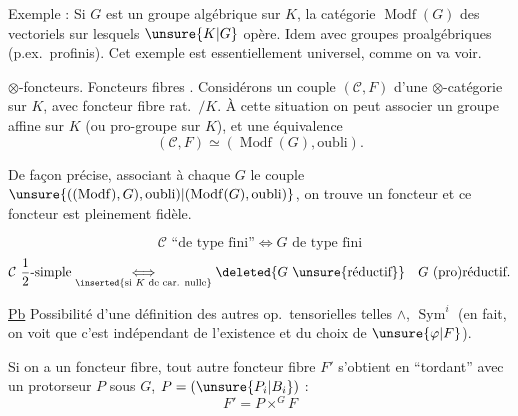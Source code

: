 Exemple : Si $G$ est un groupe algébrique sur $K$, la catégorie $\operatorname{Modf}(G)$ des vectoriels sur lesquels $\unsure{K|G}$ opère. Idem avec groupes proalgébriques (p.ex.\ profinis).
Cet exemple est essentiellement universel, comme on va voir.

$\otimes$-foncteurs. Foncteurs fibres .
Considérons un couple $(\mathcal C,F)$  d'une $\otimes$-catégorie sur $K$, avec foncteur fibre rat.\ $/K$. À cette situation on peut associer un groupe  affine sur $K$ (ou pro-groupe  sur $K$), et une équivalence
\[
(\mathcal C,F)\simeq(\operatorname{Modf}(G),\text{oubli}).
\]

De façon précise, associant à chaque $G$ le couple $\unsure{((\operatorname{Modf}),G),\mathrm{oubli})|(\operatorname{Modf}(G),\mathrm{oubli})}$, on trouve un foncteur
et ce foncteur est pleinement fidèle.

\[
\mathcal C\text{ ``de type fini''}\Longleftrightarrow G\text{ de type fini}
\]
\[
\mathcal C\text{ $\frac12$-simple}
\underset{\inserted{\text{si }K\text{ de car. nulle}}}{\Longleftrightarrow}
\deleted{G\text{ \unsure{réductif}}}\quad G\text{ (pro)réductif}.
\]

\uline{Pb} Possibilité d'une définition des autres op.\ tensorielles telles $\wedge$, $\operatorname{Sym}^i$ (en fait, on voit que c'est indépendant de l'existence et du choix de $\unsure{\varphi|F}$).

Si on a un foncteur fibre, tout autre foncteur fibre $F'$ s'obtient en ``tordant'' avec un protorseur $P$ sous $G$, $P=(\unsure{P_i|B_i})$ :
\[
F'=P\times^G F
\]
